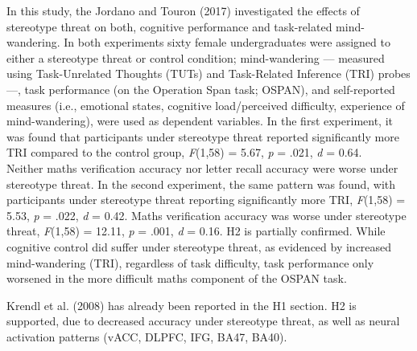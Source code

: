 \documentclass[
  stu, a4paper,floatsintext]{apa7}
\begin{document}
In this study, the Jordano and Touron (2017) investigated the effects of stereotype threat on both, cognitive performance and task-related mind-wandering.
In both experiments sixty female undergraduates were assigned to either a stereotype threat or control condition; mind-wandering --- measured using Task-Unrelated Thoughts (TUTs) and Task-Related Inference (TRI) probes ---, task performance (on the Operation Span task; OSPAN), and self-reported measures (i.e., emotional states, cognitive load/perceived difficulty, experience of mind-wandering), were used as dependent variables.
In the first experiment, it was found that participants under stereotype threat reported significantly more TRI compared to the control group, \emph{F}(1,58) = 5.67, \emph{p} = .021, \emph{d} = 0.64.\\
Neither maths verification accuracy nor letter recall accuracy were worse under stereotype threat.
In the second experiment, the same pattern was found, with participants under stereotype threat reporting significantly more TRI, \emph{F}(1,58) = 5.53, \emph{p} = .022, \emph{d} = 0.42.
Maths verification accuracy was worse under stereotype threat, \emph{F}(1,58) = 12.11, \emph{p} = .001, \emph{d} = 0.16.
H2 is partially confirmed. While cognitive control did suffer under stereotype threat, as evidenced by increased mind-wandering (TRI), regardless of task difficulty, task performance only worsened in the more difficult maths component of the OSPAN task.

Krendl et al. (2008) has already been reported in the H1 section.
H2 is supported, due to decreased accuracy under stereotype threat, as well as neural activation patterns (vACC, DLPFC, IFG, BA47, BA40).
\end{document}
